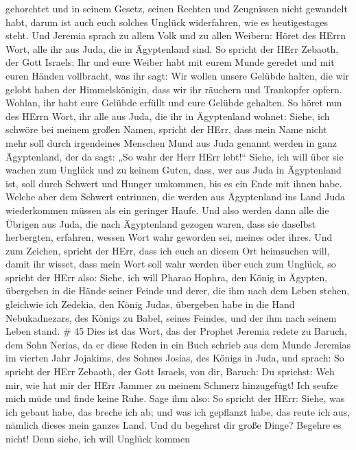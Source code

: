 gehorchtet und in seinem Gesetz, seinen Rechten und Zeugnissen nicht
gewandelt habt, darum ist auch euch solches Unglück widerfahren, wie es
heutigestages steht.  Und Jeremia sprach zu allem Volk und
zu allen Weibern: Höret des HErrn Wort, alle ihr aus Juda, die in
Ägyptenland sind.  So spricht der HErr Zebaoth, der Gott
Israels: Ihr und eure Weiber habt mit eurem Munde geredet und mit euren
Händen vollbracht, was ihr sagt: Wir wollen unsere Gelübde halten, die
wir gelobt haben der Himmelskönigin, dass wir ihr räuchern und
Trankopfer opfern. Wohlan, ihr habt eure Gelübde erfüllt und eure
Gelübde gehalten.  So höret nun des HErrn Wort, ihr alle
aus Juda, die ihr in Ägyptenland wohnet: Siehe, ich schwöre bei meinem
großen Namen, spricht der HErr, dass mein Name nicht mehr soll durch
irgendeines Menschen Mund aus Juda genannt werden in ganz Ägyptenland,
der da sagt: „So wahr der Herr HErr lebt!{}``  Siehe, ich
will über sie wachen zum Unglück und zu keinem Guten, dass, wer aus Juda
in Ägyptenland ist, soll durch Schwert und Hunger umkommen, bis es ein
Ende mit ihnen habe.  Welche aber dem Schwert entrinnen,
die werden aus Ägyptenland ins Land Juda wiederkommen müssen als ein
geringer Haufe. Und also werden dann alle die Übrigen aus Juda, die nach
Ägyptenland gezogen waren, dass sie daselbst herbergten, erfahren,
wessen Wort wahr geworden sei, meines oder ihres.  Und zum
Zeichen, spricht der HErr, dass ich euch an diesem Ort heimsuchen will,
damit ihr wisset, dass mein Wort soll wahr werden über euch zum Unglück,
 so spricht der HErr also: Siehe, ich will Pharao Hophra,
den König in Ägypten, übergeben in die Hände seiner Feinde und derer,
die ihm nach dem Leben stehen, gleichwie ich Zedekia, den König Judas,
übergeben habe in die Hand Nebukadnezars, des Königs zu Babel, seines
Feindes, und der ihm nach seinem Leben stand. \# 45  Dies
ist das Wort, das der Prophet Jeremia redete zu Baruch, dem Sohn Nerias,
da er diese Reden in ein Buch schrieb aus dem Munde Jeremias im vierten
Jahr Jojakims, des Sohnes Josias, des Königs in Juda, und sprach:
 So spricht der HErr Zebaoth, der Gott Israels, von dir,
Baruch:  Du sprichst: Weh mir, wie hat mir der HErr Jammer
zu meinem Schmerz hinzugefügt! Ich seufze mich müde und finde keine
Ruhe.  Sage ihm also: So spricht der HErr: Siehe, was ich
gebaut habe, das breche ich ab; und was ich gepflanzt habe, das reute
ich aus, nämlich dieses mein ganzes Land.  Und du begehrst
dir große Dinge? Begehre es nicht! Denn siehe, ich will Unglück kommen

